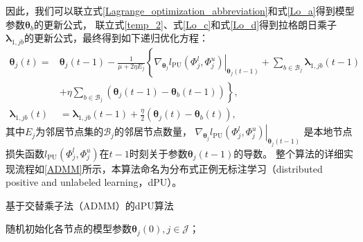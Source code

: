 因此，我们可以联立式\eqref{Lagrange_optimization_abbreviation}和式\eqref{Lo_a}得到模型参数${\boldsymbol{\theta}_b}$的更新公式，
联立式\eqref{temp_2}、式\eqref{Lo_c}和式\eqref{Lo_d}得到拉格朗日乘子$\boldsymbol\lambda_{1,jb}$的更新公式，最终得到如下递归优化方程：
\begin{subequations}
    \label{Char2_Updating}
    \begin{align}
        {\boldsymbol{\theta}_j}\left(t\right) =& {\boldsymbol{\theta}_j}\left(t-1\right) - \frac{1}{\mu+2\eta E_j}\left\{
        \left. \nabla_{\boldsymbol{\theta}_j}l_{\mathrm{PU}}\left(\boldsymbol\varPhi_j^l,\boldsymbol\varPhi_j^u\right)\right|_{\boldsymbol{\theta}_j\left(t-1\right)}
        +\sum\limits_{b\in\mathcal{B}_j}\boldsymbol\lambda_{1,jb}\left(t-1\right) \right. \nonumber\\
        & \left. + \eta\sum\limits_{b \in \mathcal{B}_j}\left({\boldsymbol{\theta}_j}\left(t-1\right) - {\boldsymbol{\theta}_b}\left(t-1\right)\right) \right\}, \label{Rc_a} \\
        \boldsymbol\lambda_{1,jb}\left(t\right) &= \boldsymbol\lambda_{1,jb}\left(t-1\right) + \frac{\eta}{2}\left({\boldsymbol{\theta}_j}\left(t\right) - {\boldsymbol{\theta}_b}\left(t\right)\right),  \label{Rc_b}
    \end{align}   
\end{subequations}
其中$E_j$为邻居节点集的$\mathcal{B}_j$的邻居节点数量，
$\left. \nabla_{\boldsymbol{\theta}_j}l_{\mathrm{PU}}\left(\boldsymbol\varPhi_j^l,\boldsymbol\varPhi_j^u\right)\right|_{\boldsymbol{\theta}_j\left(t-1\right)}$
是本地节点损失函数$l_{\mathrm{PU}}\left(\boldsymbol\varPhi_j^l,\boldsymbol\varPhi_j^u\right)$在$t-1$时刻关于参数${\boldsymbol{\theta}_j}\left(t-1\right)$的导数。
整个算法的详细实现流程如\autoref{ADMM}所示，本算法命名为分布式正例无标注学习（distributed positive and unlabeled learning，dPU）。

\begin{algorithm}[t]
	\caption{基于交替乘子法（ADMM）的dPU算法}
	\label{ADMM}
	\LinesNumbered
	{随机初始化各节点的模型参数$\boldsymbol{\theta}_j\left(0\right), j \in \mathcal{J}$}；\\
\end{algorithm}

